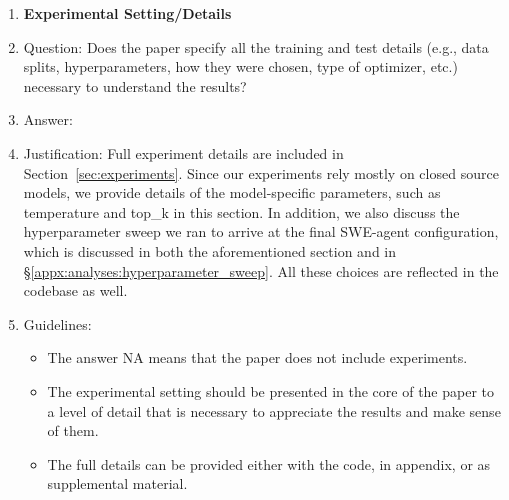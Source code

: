 \begin{enumerate}
\item {\bf Experimental Setting/Details}
    \item[] Question: Does the paper specify all the training and test details (e.g., data splits, hyperparameters, how they were chosen, type of optimizer, etc.) necessary to understand the results?
    \item[] Answer: \answerYes{}
    \item[] Justification: Full experiment details are included in Section~\ref{sec:experiments}. Since our experiments rely mostly on closed source models, we provide details of the model-specific parameters, such as temperature and top\_k in this section. In addition, we also discuss the hyperparameter sweep we ran to arrive at the final SWE-agent configuration, which is discussed in both the aforementioned section and in \S\ref{appx:analyses:hyperparameter_sweep}. All these choices are reflected in the codebase as well.
    \item[] Guidelines:
    \begin{itemize}
        \item The answer NA means that the paper does not include experiments.
        \item The experimental setting should be presented in the core of the paper to a level of detail that is necessary to appreciate the results and make sense of them.
        \item The full details can be provided either with the code, in appendix, or as supplemental material.
    \end{itemize}


\end{enumerate}

